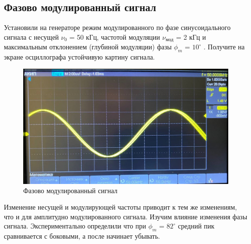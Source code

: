 \documentclass[a4paper, 12pt]{article}%
\begin{document}
 	\subsection{Фазово модулированный сигнал}
 	Установили на генераторе режим
 	модулированного по фазе синусоидального сигнала с несущей $\nu_0$ = 50 кГц,
 	частотой модуляции $\nu_{мод}$ = 2 кГц и максимальным отклонением (глубиной
 	модуляции) фазы $\phi_{m}$ = $10^\circ$
 	. Получите на экране осциллографа устойчивую
 	картину сигнала.
 	\begin{figure}[H]
 		\centering
 		\includegraphics[width=0.7\linewidth]{photo_11}
 		\caption{Фазово модулированный сигнал}
 		\label{fig:photo11}
 	\end{figure}
 	Изменение несущей и модулирующей частоты приводит к тем же изменениям, что и для амплитудно модулированного сигнала. Изучим влияние изменения фазы сигнала.
 	Экспериментально определили что при $\phi_{m}$ = $82^\circ$ средний пик сравнивается с боковыми, а после начинает убывать.
\end{document}

